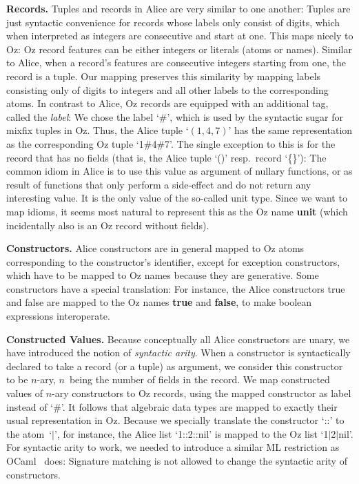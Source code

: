 \documentclass{entcs}
\newcommand{\kw}[1]{{\bfseries#1}}
\begin{document}
{\bfseries Records.}
Tuples and records in Alice are very similar to one another:  Tuples are
just syntactic convenience for records whose labels only consist of digits,
which when interpreted as integers are consecutive and start at one.
This maps nicely to Oz:  Oz record features can be either integers or
literals (atoms or names).  Similar to Alice, when a record's features
are consecutive integers starting from one, the record is a tuple.  Our
mapping preserves this similarity by mapping labels consisting only of digits
to integers and all other labels to the corresponding atoms.  In contrast to
Alice, Oz records are equipped with an additional tag, called the \emph{label}:
We chose the label `\#', which is used by the syntactic sugar for mixfix
tuples in Oz.  Thus, the Alice tuple `$(1, 4, 7)$' has the same representation
as the corresponding Oz tuple `1\#4\#7'.  The single exception to this is for
the record that has no fields (that is, the Alice tuple `()' resp.\ record
`\{\}'):  The common idiom in Alice is to use this value as argument of
nullary functions, or as result of functions that only perform a side-effect
and do not return any interesting value.  It is the only value of the
so-called unit type.  Since we want to map idioms, it seems most natural to
represent this as the Oz name \kw{unit} (which incidentally also is an Oz
record without fields).

{\bfseries Constructors.}
Alice constructors are in general mapped to Oz atoms corresponding to the
constructor's identifier, except for exception constructors, which have to
be mapped to Oz names because they are generative.  Some constructors have a
special translation:  For instance, the Alice constructors true and false are
mapped to the Oz names \kw{true} and \kw{false}, to make boolean expressions
interoperate.

{\bfseries Constructed Values.}
Because conceptually all Alice constructors are unary, we have introduced
the notion of \emph{syntactic arity}.  When a constructor is syntactically
declared to take a record (or a tuple) as argument, we consider this
constructor to be $n$-ary, $n$~being the number of fields in the record.
We map constructed values of $n$-ary constructors to Oz records, using
the mapped constructor as label instead of `\#'.  It follows that algebraic
data types are mapped to exactly their usual representation in Oz.
Because we specially translate the constructor `::' to the atom~`$|$',
for instance, the Alice list `1::2::nil' is mapped to the Oz list
`1$|$2$|$nil'.  For syntactic arity to work, we needed to introduce a
similar ML restriction as OCaml~\cite{OCaml} does:  Signature matching is
not allowed to change the syntactic arity of constructors.
\end{document}
